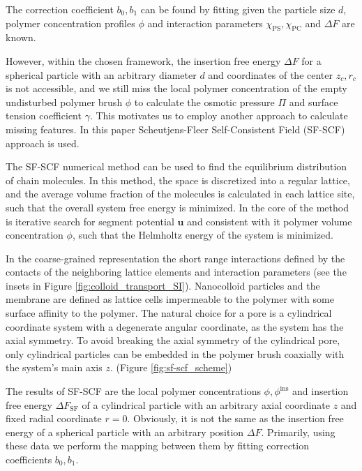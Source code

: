 \documentclass[12pt, a4paper]{article}
\begin{document}
The correction coefficient $b_0, b_1$ can be found by fitting given the particle size $d$, polymer concentration profiles $\phi$ and interaction parameters $\chi_{\textrm{PS}}, \chi_{\textrm{PC}}$ and $\Delta F$ are known.

However, within the chosen framework, the insertion free energy $\Delta F$ for a spherical particle with an arbitrary diameter $d$ and coordinates of the center $z_c, r_c$ is not accessible, and we still miss the local polymer concentration of the empty undisturbed polymer brush $\phi$ to calculate the osmotic pressure $\Pi$ and surface tension coefficient $\gamma$.
This motivates us to employ another approach to calculate missing features. 
In this paper Scheutjens-Fleer Self-Consistent Field (SF-SCF) approach is used.

The SF-SCF numerical method can be used to find the equilibrium distribution of chain molecules.
In this method, the space is discretized into a regular lattice, and the average volume fraction of the molecules is calculated in each lattice site, such that the overall system free energy is minimized.
In the core of the method is iterative search for segment potential $\mathbf{u}$ and consistent with it polymer volume concentration $\phi$, such that the Helmholtz energy of the system is minimized.

In the coarse-grained representation the short range interactions defined by the contacts of the neighboring lattice elements and interaction parameters (see the insets in Figure \ref{fig:colloid_transport_SI}).
Nanocolloid particles and the membrane are defined as lattice cells impermeable to the polymer with some surface affinity to the polymer.
The natural choice for a pore is a cylindrical coordinate system with a degenerate angular coordinate, as the system has the axial symmetry.
To avoid breaking the axial symmetry of the cylindrical pore, only cylindrical particles can be embedded in the polymer brush coaxially with the system's main axis $z$. (Figure \ref{fig:sf-scf_scheme})

The results of SF-SCF are the local polymer concentrations $\phi, \phi^{\textrm{ins}}$ and insertion free energy $\Delta F_{\textrm{SF}}$ of a cylindrical particle with an arbitrary axial coordinate $z$ and fixed radial coordinate $r=0$. 
Obviously, it is not the same as the insertion free energy of a spherical particle with an arbitrary position $\Delta F$.
Primarily, using these data we perform the mapping between them by fitting correction coefficients $b_0, b_1$.
\end{document}

